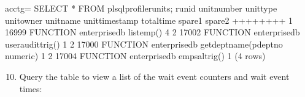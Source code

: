 \documentclass[letterpaper,10pt,english,openany,oneside]{sphinxmanual}
\begin{document}
%
\begin{sphinxVerbatim}[commandchars=\\\{\}]
acctg=\PYGZsh{} SELECT * FROM plsql\PYGZus{}profiler\PYGZus{}units;
 runid \textbar{} unit\PYGZus{}number \textbar{} unit\PYGZus{}type \textbar{}  unit\PYGZus{}owner  \textbar{}            unit\PYGZus{}name            \textbar{} unit\PYGZus{}timestamp \textbar{} total\PYGZus{}time \textbar{} spare1 \textbar{} spare2
\PYGZhy{}\PYGZhy{}\PYGZhy{}\PYGZhy{}\PYGZhy{}\PYGZhy{}\PYGZhy{}+\PYGZhy{}\PYGZhy{}\PYGZhy{}\PYGZhy{}\PYGZhy{}\PYGZhy{}\PYGZhy{}\PYGZhy{}\PYGZhy{}\PYGZhy{}\PYGZhy{}\PYGZhy{}\PYGZhy{}+\PYGZhy{}\PYGZhy{}\PYGZhy{}\PYGZhy{}\PYGZhy{}\PYGZhy{}\PYGZhy{}\PYGZhy{}\PYGZhy{}\PYGZhy{}\PYGZhy{}+\PYGZhy{}\PYGZhy{}\PYGZhy{}\PYGZhy{}\PYGZhy{}\PYGZhy{}\PYGZhy{}\PYGZhy{}\PYGZhy{}\PYGZhy{}\PYGZhy{}\PYGZhy{}\PYGZhy{}\PYGZhy{}+\PYGZhy{}\PYGZhy{}\PYGZhy{}\PYGZhy{}\PYGZhy{}\PYGZhy{}\PYGZhy{}\PYGZhy{}\PYGZhy{}\PYGZhy{}\PYGZhy{}\PYGZhy{}\PYGZhy{}\PYGZhy{}\PYGZhy{}\PYGZhy{}\PYGZhy{}\PYGZhy{}\PYGZhy{}\PYGZhy{}\PYGZhy{}\PYGZhy{}\PYGZhy{}\PYGZhy{}\PYGZhy{}\PYGZhy{}\PYGZhy{}\PYGZhy{}\PYGZhy{}\PYGZhy{}\PYGZhy{}\PYGZhy{}\PYGZhy{}+\PYGZhy{}\PYGZhy{}\PYGZhy{}\PYGZhy{}\PYGZhy{}\PYGZhy{}\PYGZhy{}\PYGZhy{}\PYGZhy{}\PYGZhy{}\PYGZhy{}\PYGZhy{}\PYGZhy{}\PYGZhy{}\PYGZhy{}\PYGZhy{}+\PYGZhy{}\PYGZhy{}\PYGZhy{}\PYGZhy{}\PYGZhy{}\PYGZhy{}\PYGZhy{}\PYGZhy{}\PYGZhy{}\PYGZhy{}\PYGZhy{}\PYGZhy{}+\PYGZhy{}\PYGZhy{}\PYGZhy{}\PYGZhy{}\PYGZhy{}\PYGZhy{}\PYGZhy{}\PYGZhy{}+\PYGZhy{}\PYGZhy{}\PYGZhy{}\PYGZhy{}\PYGZhy{}\PYGZhy{}\PYGZhy{}\PYGZhy{}
     1 \textbar{}       16999 \textbar{} FUNCTION  \textbar{} enterprisedb \textbar{} list\PYGZus{}emp()                      \textbar{}                \textbar{}          4 \textbar{}        \textbar{}
     2 \textbar{}       17002 \textbar{} FUNCTION  \textbar{} enterprisedb \textbar{} user\PYGZus{}audit\PYGZus{}trig()               \textbar{}                \textbar{}          1 \textbar{}        \textbar{}
     2 \textbar{}       17000 \textbar{} FUNCTION  \textbar{} enterprisedb \textbar{} get\PYGZus{}dept\PYGZus{}name(p\PYGZus{}deptno numeric) \textbar{}                \textbar{}          1 \textbar{}        \textbar{}
     2 \textbar{}       17004 \textbar{} FUNCTION  \textbar{} enterprisedb \textbar{} emp\PYGZus{}sal\PYGZus{}trig()                  \textbar{}                \textbar{}          1 \textbar{}        \textbar{}
(4 rows)
\end{sphinxVerbatim}
\begin{enumerate}
\setcounter{enumi}{9}
\item {} 
Query the  table to view a list of the wait event counters and wait event times:

\end{enumerate}
\end{document}
